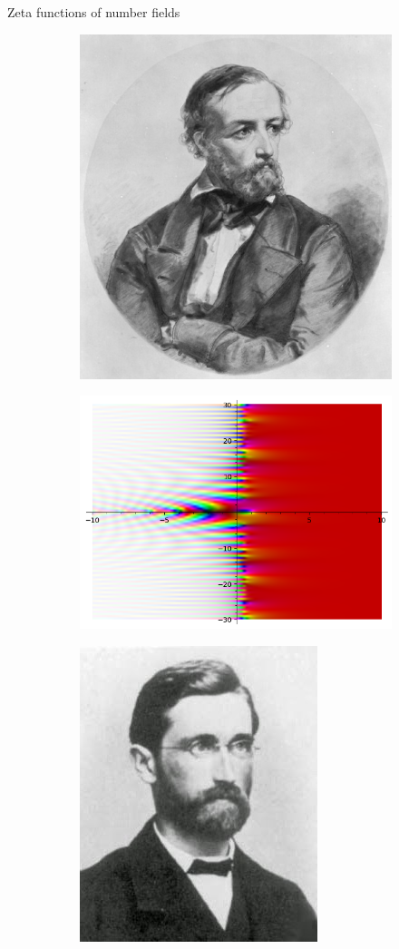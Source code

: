 \documentclass[10pt]{beamer}
\begin{document}
\begin{frame}{Zeta functions of number fields}
  \begin{figure}[H]
  \centering
  \begin{subfigure}[b]{0.3\textwidth}
  \centering
\includegraphics[width=.6\textwidth]{Dirichlet.jpg}
\end{subfigure}
  \begin{subfigure}[b]{0.3\textwidth}
  \centering
\includegraphics[width=\textwidth]{Fzeta-plot.png}
\end{subfigure}
  \begin{subfigure}[b]{0.3\textwidth}
  \centering
\includegraphics[width=.5\textwidth]{Dedekind.jpg}

\end{subfigure}
\end{figure}
\end{frame}
\end{document}

